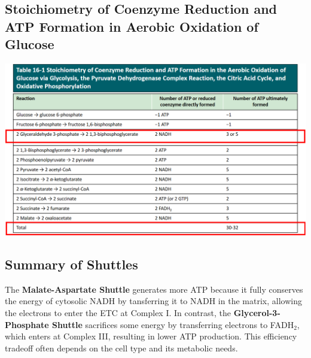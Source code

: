 \documentclass[10pt]{article}
\begin{document}
\subsection*{Stoichiometry of Coenzyme Reduction and ATP Formation in Aerobic Oxidation of Glucose}
\begin{center} 
	\includegraphics*[width=\textwidth]{L3_17.png}
\end{center}

\subsection*{Summary of Shuttles}
The \textbf{Malate-Aspartate Shuttle} generates more ATP because it fully conserves the energy of cytosolic NADH by tansferring it to NADH in the matrix, allowing the electrons to enter the ETC at Complex I.  In contrast, the \textbf{Glycerol-3-Phosphate Shuttle} sacrifices some energy by transferring electrons to FADH$_2$, which enters at Complex III, resulting in lower ATP production.  This efficiency tradeoff often depends on the cell type and its metabolic needs.
\end{document}

